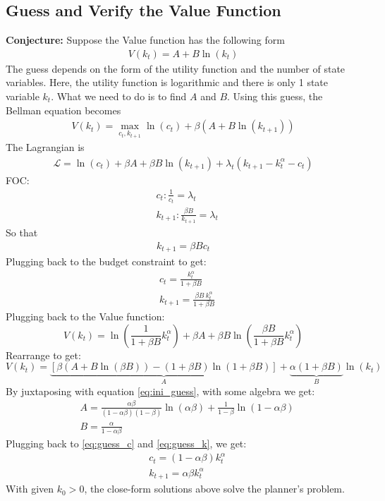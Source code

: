 \documentclass[11pt,a4paper]{book}
\theoremstyle{definition}\newtheorem{definition}{Definition}
\theoremstyle{definition}\newtheorem{fact}{Fact}
\theoremstyle{definition}\newtheorem{remark}{Remark}
\theoremstyle{definition}\newtheorem{ex}{Ex.}
\theoremstyle{definition}\newtheorem{project}{Project}
\theoremstyle{definition}\newtheorem{problem}{Problem}
\theoremstyle{definition}\newtheorem{example}{Example}
\numberwithin{theorem}{section}
\numberwithin{corollary}{chapter}
\numberwithin{assumption}{chapter}
\numberwithin{definition}{chapter}
\numberwithin{prop}{chapter}
\numberwithin{notation}{chapter}
\numberwithin{problem}{chapter}
\numberwithin{example}{chapter}
\numberwithin{fact}{chapter}
\numberwithin{ex}{chapter}
\begin{document}
	\subsection{Guess and Verify the Value Function}
	\textbf{Conjecture:} Suppose the Value function has the following form
	\begin{align}
		V(k_t) = A + B \ln (k_t) \label{eq:ini_guess}
	\end{align}
	The guess depends on the form of the utility function and the number of state variables. Here, the utility function is logarithmic and there is only 1 state variable $k_t$. What we need to do is to find $A$ and $B$. Using this guess, the Bellman equation becomes
	\begin{align*}
		V(k_t) = \max_{c_t, k_{t+1}} \ln(c_t) + \beta (A + B \ln(k_{t+1}))
	\end{align*}
	The Lagrangian is
	\begin{align*}
		\mathcal{L} = \ln(c_t) + \beta A + \beta B \ln(k_{t+1}) + \lambda_t (k_{t+1} - k_t^\alpha - c_t)
	\end{align*}
	FOC:
	\begin{align}
		& c_t: \frac{1}{c_t} = \lambda_t \\
		& k_{t+1}: \frac{\beta B}{k_{t+1}} = \lambda_t
	\end{align}
	So that
	\begin{align*}
		k_{t+1} = \beta B c_t
	\end{align*}
	Plugging back to the budget constraint to get:
	\begin{align}
		& c_t = \frac{k_t^\alpha}{1 + \beta B}  \label{eq:guess_c} \\
		& k_{t+1} = \frac{\beta B \ k_t^\alpha}{1+\beta B} \label{eq:guess_k}
	\end{align}
	Plugging back to the Value function:
	$$
	V(k_t) = \ln(\frac{1}{1+\beta B}k_t^\alpha) + \beta A + \beta B \ln(\frac{\beta B}{1+\beta B}k^\alpha_t)
	$$
	Rearrange to get:
	$$
	V(k_t) = \underbrace{\left[ \beta(A + B\ln(\beta B)) - (1+\beta B)\ln(1+\beta B) \right]}_{A} + \underbrace{\alpha (1+\beta B)}_{B}\ln(k_t)
	$$
	By juxtaposing with equation \eqref{eq:ini_guess}, with some algebra we get:
	\begin{align*}
		& A = \frac{\alpha\beta}{(1-\alpha\beta)(1-\beta)}\ln(\alpha\beta) + \frac{1}{1-\beta}\ln(1-\alpha\beta)\\
		& B = \frac{\alpha}{1-\alpha\beta}
	\end{align*}
	Plugging back to \eqref{eq:guess_c} and \eqref{eq:guess_k}, we get:
	\begin{align*}
		& c_t = (1-\alpha\beta)k_t^\alpha \\
		& k_{t+1} = \alpha \beta k_t^\alpha
	\end{align*}
	With given $k_0 > 0$, the close-form solutions above solve the planner's problem.
	
\end{document}
